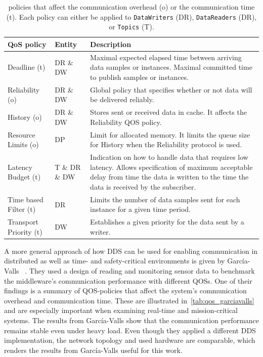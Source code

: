 \begin{table}[h!]
	\begin{center}
		\caption{ policies that affect the communication overhead (o) or the communication time (t). Each  policy can either be applied to \texttt{DataWriters} (DR), \texttt{DataReaders} (DR), or \texttt{Topics} (T).}
		\label{tab:qos_garciavalls}
		\begin{tabularx}{\textwidth}{|l|l|X|}
			\hline
			\textbf{QoS policy} & \textbf{Entity} & \textbf{Description}\\
			\hline \hline
			Deadline (t) & DR \& DW & Maximal expected elapsed time between arriving data samples or instances. Maximal committed time to publish samples or instances.\\
			\hline
			Reliability (o) & DR \& DW & Global policy that specifies whether or not data will be delivered reliably. \\
			\hline
			History (o) & DR \& DW & Stores sent or received data in cache. It affects the Reliability \gls*{QOS} policy. \\
			\hline
			Resource Limits (o) & DP & Limit for allocated memory. It limits the queue size for History when the Reliability protocol is used. \\
			\hline
			Latency Budget (t) & T \& DR \& DW & Indication on how to handle data that requires low latency. Allows specification of maximum acceptable delay from time the data is written to the time the data is received by the subscriber. \\
			\hline
			Time based Filter (t) & DR & Limits the number of data samples sent for each instance for a given time period. \\
			\hline
			Transport Priority (t) & DW & Establishes a given priority for the data sent by a writer.\\
			\hline
		\end{tabularx}
	\end{center}
\end{table}

A more general approach of how \gls*{DDS} can be used for enabling communication in distributed as well as time- and safety-critical environments is given by García-Valls \etal~\cite{GarciaVallsDDSInDistributed}.
They used a design of reading and monitoring sensor data to benchmark the middleware's communication performance with different \glspl*{QOS}.
One of their findings is a summary of \gls*{QOS}-policies that affect the system's communication overhead and communication time.
These are illustrated in~\autoref{tab:qos_garciavalls} and are especially important when examining real-time and mission-critical systems.
The results from García-Valls \etal show that the communication performance remains stable even under heavy load.
Even though they applied a different \gls*{DDS} implementation, the network topology and used hardware are comparable, which renders the results from García-Valls \etal useful for this work.

